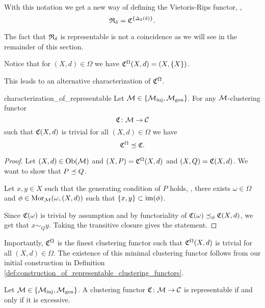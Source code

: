 \begin{example}{}{}
With this notation we get a new way of defining the Vietoris-Rips functor, \ie,
$$
\mathfrak{R}_\delta = \mathfrak{C}^{\{\Delta_2(\delta)\}}.
$$
\end{example}
The fact that $\mathfrak{R}_\delta$ is representable is not a coincidence as we will see in the remainder of this section.
\begin{myremark}{\cite[Rem.~6.3]{Carlsson2010}}{}
Notice that for $(X,d) \in \Omega$ we have $\mathfrak{C}^\Omega(X,d) = (X, \{X\})$.
\end{myremark}

This leads to an alternative characterization of $\mathfrak{C}^\Omega$.

\begin{proposition}{}{characterization_of_representable}
Let $\mathcal{M} \in \{{\mathcal{M}_\mathrm{inj}}, {\mathcal{M}_\mathrm{gen}}\}$. For any $\mathcal{M}$-clustering functor
$$
\mathfrak{C}\colon \mathcal{M} \to \mathcal{C}
$$
such that $\mathfrak{C}(X,d)$ is trivial for all $(X,d) \in \Omega$ we have
$$
\mathfrak{C}^\Omega \preceq \mathfrak{C}.
$$
\end{proposition}

\begin{proof}
Let $(X,d) \in \mathrm {Ob}(\mathcal{M})$ and $(X,P) = \mathfrak{C}^\Omega(X,d)$ and $(X,Q) = \mathfrak{C}(X,d)$. We want to show that $P \preceq Q$.

Let $x,y \in X$ such that the generating condition of $P$ holds, \ie, there exists $\omega \in \Omega$ and $\phi \in \mathrm {Mor}_{\mathcal{M}}(\omega, (X,d))$ such that $\{x,y\} \subset \operatorname*{im}(\phi)$.

Since $\mathfrak{C}(\omega)$ is trivial by assumption and by functoriality of $\mathfrak{C}(\omega) \preceq_\phi \mathfrak{C}(X,d)$, we get that $x \sim_Q y$. Taking the transitive closure gives the statement.
\end{proof}

Importantly, $\mathfrak{C}^\Omega$ is the finest clustering functor such that $\mathfrak{C}^\Omega(X,d)$ is trivial for all $(X,d) \in \Omega$. The existence of this minimal clustering functor follows from our initial construction in Definition \ref{def:construction_of_representable_clustering_functors}.

\begin{theorem}{\cite[Thm.~6.2]{Carlsson2010}}{}
Let $\mathcal{M} \in \{{\mathcal{M}_\mathrm{inj}}, {\mathcal{M}_\mathrm{gen}}\}$. A clustering functor $\mathfrak{C}\colon \mathcal{M} \to \mathcal{C}$ is representable if and only if it is excessive.
\end{theorem}

